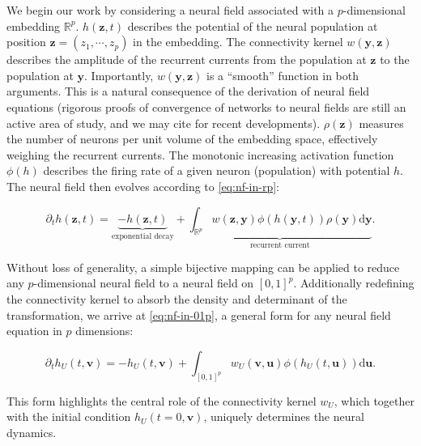 \documentclass[10pt,letterpaper]{article}
\def\R{\mathbb R}
\def\Rp{\R^p}
\renewcommand{\vec}[1]{\boldsymbol{#1}}
\begin{document}
We begin our work by considering a neural field associated with a $p$-dimensional embedding $\Rp$. $h(\vec z, t)$ describes the potential of the neural population at position $\vec z=(z_1,\cdots,z_p)$ in the embedding. The connectivity kernel $w(\vec y, \vec z)$ describes the amplitude of the recurrent currents from the population at $\vec z$ to the population at $\vec y$. Importantly, $w(\vec y, \vec z)$ is a ``smooth'' function in both arguments. This is a natural consequence of the derivation of neural field equations (rigorous proofs of convergence of networks to neural fields are still an active area of study, and we may cite \cite{CheDua19,AGATHENERINE202286} for recent developments).
$\rho(\vec z)$ measures the number of neurons per unit volume of the embedding space, effectively weighing the recurrent currents. The monotonic increasing activation function $\phi(h)$ describes the firing rate of a given neuron (population) with potential $h$. The neural field then evolves according to \autoref{eq:nf-in-rp}:  

\begin{equation} \label{eq:nf-in-rp}
\partial_t h(\vec z, t) = \underbrace{-h(\vec z, t)}_\text{exponential decay} + \underbrace{\int_{\mathbb{R}^p} w(\vec z, \vec y) \phi(h(\vec y, t)) \rho(\vec y) \mathrm d \vec y}_\text{recurrent current}.
\end{equation}

Without loss of generality, a simple bijective mapping can be applied to reduce any $p$-dimensional neural field to a neural field on $[0,1]^p$. Additionally redefining the connectivity kernel to absorb the density and determinant of the transformation, we arrive at \autoref{eq:nf-in-01p}, a general form for any neural field equation in $p$ dimensions:


\begin{equation} \label{eq:nf-in-01p}
\partial_t h_U(t, \vec v) = -h_U(t, \vec v) + \int_{[0,1]^p} w_U(\vec v, \vec u) \phi(h_U(t, \vec u)) \mathrm d \vec u.
\end{equation}

This form highlights the central role of the connectivity kernel $w_U$, which together with the initial condition $h_U(t=0, \vec v)$, uniquely determines the neural dynamics.
\end{document}
